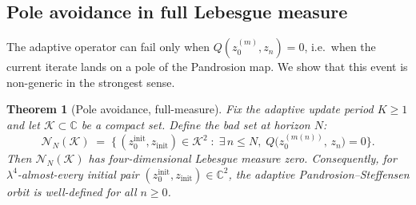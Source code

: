 \documentclass[10pt,a4paper,oneside]{book}
\newtheorem{theorem}{Theorem}[chapter]
\theoremstyle{definition}
\theoremstyle{remark}
\newcommand{\CC}{\mathbb{C}}
\begin{document}
\subsection{Pole avoidance in full Lebesgue measure}

The adaptive operator can fail only when $Q(z_0^{(m)}, z_n) = 0$, i.e.\ when the current iterate lands on a pole of the Pandrosion map.  We show that this event is non-generic in the strongest sense.

\begin{theorem}[Pole avoidance, full-measure]
\label{thm:pole_avoidance}
Fix the adaptive update period $K \geq 1$ and let $\mathcal{K} \subset \CC$ be a compact set.  Define the \emph{bad set at horizon $N$}:
\[
  \mathcal{N}_N(\mathcal{K}) \;=\; \bigl\{\, (z_0^{\mathrm{init}}, z_{\mathrm{init}}) \in \mathcal{K}^2 \;:\;\exists\, n \leq N,\; Q\bigl(z_0^{(m(n))},\, z_n\bigr) = 0 \bigr\}.
\]
Then $\mathcal{N}_N(\mathcal{K})$ has four-dimensional Lebesgue measure zero.  Consequently, for $\lambda^4$-almost-every initial pair $(z_0^{\mathrm{init}}, z_{\mathrm{init}}) \in \CC^2$, the adaptive Pandrosion--Steffensen orbit is well-defined for all $n \geq 0$.
\end{theorem}
\end{document}
